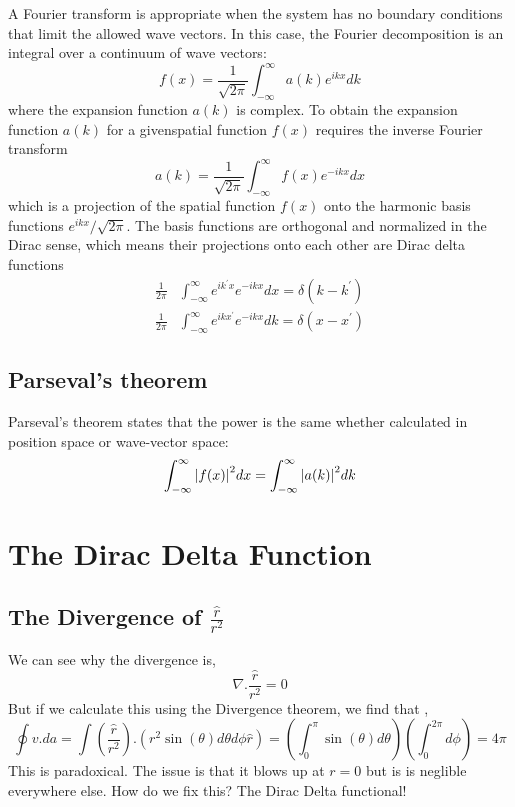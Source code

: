 A Fourier transform is appropriate when the system has no boundary conditions that limit the allowed wave vectors. In this case, the Fourier decomposition is an integral over a continuum of wave vectors:
\begin{equation}
	f(x) = \frac{1}{\sqrt{2 \pi}} \int_{-\infty}^{\infty} a(k)e^{ikx}dk
\end{equation}
where  the  expansion  function  $a(k)$  is  complex. To  obtain  the  expansion  function  $a(k)$  for  a  givenspatial function $f(x)$ requires the inverse Fourier transform
\begin{equation}
	a(k) = \frac{1}{\sqrt{2 \pi}} \int_{-\infty}^{\infty} f(x)e^{-ikx}dx
\end{equation}
which is a projection of the spatial function $f(x)$ onto the harmonic basis functions $e^{ikx}/\sqrt{2 \pi}$. The basis functions are orthogonal and normalized in the Dirac sense, which means their projections onto each other are Dirac delta functions
\begin{equation}
\begin{split}
	\frac{1}{2 \pi} & \int_{-\infty}^{\infty} e^{ik^{'}x}e^{-ikx}dx = \delta(k-k^{'})\\
	\frac{1}{2 \pi} & \int_{-\infty}^{\infty} e^{ikx^{'}}e^{-ikx}dk = \delta(x-x^{'})
\end{split}
\end{equation}
\subsection{Parseval’s theorem}
Parseval’s theorem states that the power is the same whether calculated in position space or wave-vector space:
\begin{equation}
\int^{\infty}_{-\infty} \abs{f(x)}^{2}dx = \int^{\infty}_{-\infty} \abs{a(k)}^{2}dk
\end{equation}

\section{The Dirac Delta Function}
\subsection{The Divergence of $\frac{\hat{r}}{r^{2}}$}
We can see why the divergence is,
\begin{equation}
\nabla . \frac{\hat{r}}{r^{2}} = 0
\end{equation}
But if we calculate this using the Divergence theorem, we find that ,
\begin{equation}
	\oint v .da = \int \left( \frac{\hat{r}}{r^{2}} \right) . \left( r^{2} \sin(\theta) d \theta d \phi \hat{r} \right) = \left( \int_{0}^{\pi} \sin(\theta) d \theta \right) \left( \int_{0}^{2\pi} d \phi \right) = 4 \pi
\end{equation}
This is paradoxical. The issue is that it blows up at $r=0$ but is is neglible everywhere else. How do we fix this? The Dirac Delta functional!
